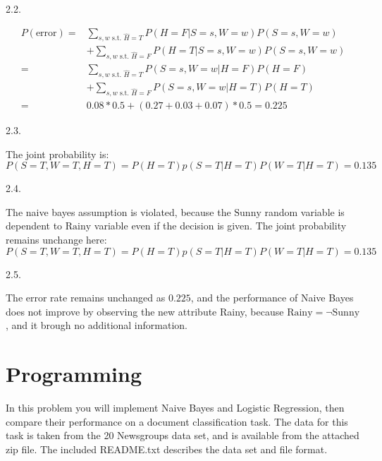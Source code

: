 \documentclass{article}
\theoremstyle{definition}
\theoremstyle{definition}
\theoremstyle{remark}
\begin{document}
2.2.
\begin{addmargin}[3em]{2em}
  \[
  \begin{split}
    P(\mbox{error}) = & \sum_{s, w \mbox{ s.t. } \hat{H}=T}P(H=F|S=s,W=w)P(S=s, W=w)\\
    & + \sum_{s, w \mbox{ s.t. } \hat{H} = F}P(H=T|S=s, W=w)P(S=s, W=w) \\
    = & \sum_{s, w \mbox{ s.t. } \hat{H}=T}P(S=s,W=w|H=F)P(H=F)\\
    & + \sum_{s, w \mbox{ s.t. } \hat{H}=F}P(S=s,W=w|H=T)P(H=T) \\
    = & 0.08 * 0.5 + (0.27 + 0.03 + 0.07) * 0.5 = 0.225
  \end{split}
  \]
\end{addmargin}

2.3.
\begin{addmargin}[3em]{2em}
   The joint probability is:
\[
P(S=T,W=T,H=T) = P(H=T)p(S=T|H=T)P(W=T|H=T) = 0.135
\]
\end{addmargin}

2.4.

\begin{addmargin}[3em]{2em}
  The naive bayes assumption is violated, because the $\mbox{Sunny}$ random variable is dependent to $\mbox{Rainy}$ variable even if the decision is given. The joint probability remains unchange here:
  \[
  P(S=T,W=T,H=T) = P(H=T)p(S=T|H=T)P(W=T|H=T) = 0.135
  \]
\end{addmargin}

2.5.
\begin{addmargin}[3em]{2em}
  The error rate remains unchanged as $0.225$, and the performance of Naive Bayes does not improve by observing the new attribute Rainy, because $\mbox{Rainy} = \neg \mbox{Sunny}$, and it brough no additional information.
\end{addmargin}


\section*{Programming}
In this problem you will implement Naive Bayes and Logistic Regression, then compare their performance on a
document classification task. The data for this task is taken from the 20 Newsgroups data set, and is available
from the attached zip file. The included README.txt describes the data set and file format.
\end{document}
